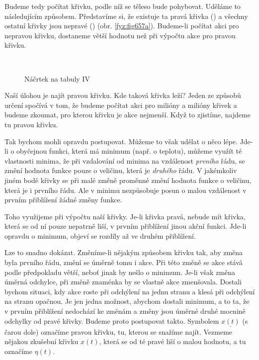     
    Budeme tedy počítat křivku, podle níž se těleso bude pohybovat. Uděláme to následujícím
    způsobem. Představíme si, že existuje ta pravá křivka () a všechny ostatní křivky
    jsou nepravé () (obr. \ref{fyz:fig657a}). Budeme-li počítat akci pro nepravou
    křivku, dostaneme větší hodnotu než při výpočtu akce pro pravou křivku.

    \begin{figure}[ht!]
      \centering
        \\
      \caption{Náčrtek na tabuly IV}
      \label{fyz:fig657}
    \end{figure}
    
    Naší úlohou je najít pravou křivku. Kde taková křivka leží? Jeden ze způsobů určení spočívá v
    tom, že budeme počítat akci pro milióny a milióny křivek a budeme zkoumat, pro kterou křivku je
    akce nejmenší. Když to zjistíme, najdeme tu pravou křivku.

    Tak bychom mohli opravdu postupovat. Můžeme to však udělat o něco lépe. Jde-li o obyčejnou
    funkci, která má minimum (např. o teplotu), můžeme využít té vlastnosti minima, že při
    vzdalování od minima na vzdálenost \emph{prvního} řádu, se změní hodnota funkce pouze o
    veličinu, která je \emph{druhého} řádu. V jakémkoliv jiném bodě křivky se při malé změně
    proměnné změní hodnota funkce o veličinu, která je i prvního řádu. Ale v minimu nezpůsobuje
    posun o malou vzdálenost v prvním přiblížení žádné změny funkce.

    Toho využijeme při výpočtu naší křivky. Je-li křivka pravá, nebude mít křivka, která se od ní
    pouze nepatrně liší, v prvním přiblížení jinou akční funkci. Jde-li opravdu o minimum, objeví se
    rozdíly až ve druhém přiblížení.
    
    Lze to snadno dokázat. Změníme-li nějakým způsobem křivku tak, aby změna byla prvního řádu,
    změní se úměrně tomu i akce. Při této změně se akce stává podle předpokladu větší, neboť jinak
    by nešlo o minimum. Je-li však změna úměrná odchylce, při změně znaménka by se vlastně akce
    zmenšovala. Dostali bychom situaci, kdy akce roste při odchýlení na jednu stranu a klesá při
    odchýlení na stranu opačnou. Je jen jedna možnost, abychom dostali minimum, a to ta, že v prvním
    přiblížení nedochází ke změnám a změny jsou úměrné druhé mocnině odchylky od pravé křivky.
    Budeme proto postupovat takto. Symbolem \(\underline{x(t)}\) (s čarou dole) označíme pravou
    křivku, tu, kterou se snažíme najít. Vezmeme nějakou zkušební křivku \(x(t)\), která se od té
    pravé liší o malou hodnotu, a tu označíme \(\eta(t)\).

